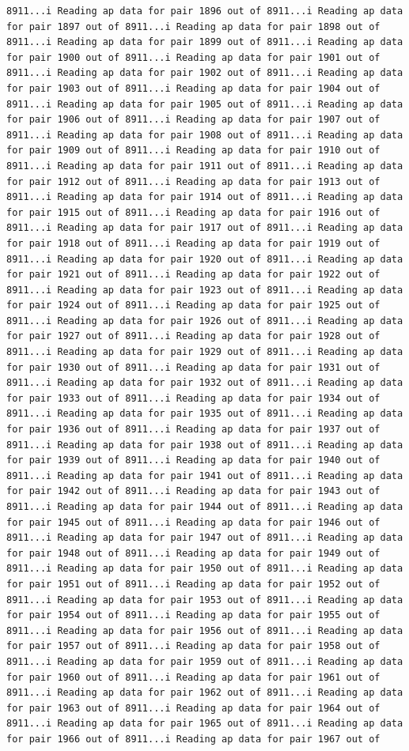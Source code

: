 \documentclass[
]{article}
\begin{document}
\begin{verbatim}
8911...i Reading ap data for pair 1896 out of 8911...i Reading ap data for pair 1897 out of 8911...i Reading ap data for pair 1898 out of 8911...i Reading ap data for pair 1899 out of 8911...i Reading ap data for pair 1900 out of 8911...i Reading ap data for pair 1901 out of 8911...i Reading ap data for pair 1902 out of 8911...i Reading ap data for pair 1903 out of 8911...i Reading ap data for pair 1904 out of 8911...i Reading ap data for pair 1905 out of 8911...i Reading ap data for pair 1906 out of 8911...i Reading ap data for pair 1907 out of 8911...i Reading ap data for pair 1908 out of 8911...i Reading ap data for pair 1909 out of 8911...i Reading ap data for pair 1910 out of 8911...i Reading ap data for pair 1911 out of 8911...i Reading ap data for pair 1912 out of 8911...i Reading ap data for pair 1913 out of 8911...i Reading ap data for pair 1914 out of 8911...i Reading ap data for pair 1915 out of 8911...i Reading ap data for pair 1916 out of 8911...i Reading ap data for pair 1917 out of 8911...i Reading ap data for pair 1918 out of 8911...i Reading ap data for pair 1919 out of 8911...i Reading ap data for pair 1920 out of 8911...i Reading ap data for pair 1921 out of 8911...i Reading ap data for pair 1922 out of 8911...i Reading ap data for pair 1923 out of 8911...i Reading ap data for pair 1924 out of 8911...i Reading ap data for pair 1925 out of 8911...i Reading ap data for pair 1926 out of 8911...i Reading ap data for pair 1927 out of 8911...i Reading ap data for pair 1928 out of 8911...i Reading ap data for pair 1929 out of 8911...i Reading ap data for pair 1930 out of 8911...i Reading ap data for pair 1931 out of 8911...i Reading ap data for pair 1932 out of 8911...i Reading ap data for pair 1933 out of 8911...i Reading ap data for pair 1934 out of 8911...i Reading ap data for pair 1935 out of 8911...i Reading ap data for pair 1936 out of 8911...i Reading ap data for pair 1937 out of 8911...i Reading ap data for pair 1938 out of 8911...i Reading ap data for pair 1939 out of 8911...i Reading ap data for pair 1940 out of 8911...i Reading ap data for pair 1941 out of 8911...i Reading ap data for pair 1942 out of 8911...i Reading ap data for pair 1943 out of 8911...i Reading ap data for pair 1944 out of 8911...i Reading ap data for pair 1945 out of 8911...i Reading ap data for pair 1946 out of 8911...i Reading ap data for pair 1947 out of 8911...i Reading ap data for pair 1948 out of 8911...i Reading ap data for pair 1949 out of 8911...i Reading ap data for pair 1950 out of 8911...i Reading ap data for pair 1951 out of 8911...i Reading ap data for pair 1952 out of 8911...i Reading ap data for pair 1953 out of 8911...i Reading ap data for pair 1954 out of 8911...i Reading ap data for pair 1955 out of 8911...i Reading ap data for pair 1956 out of 8911...i Reading ap data for pair 1957 out of 8911...i Reading ap data for pair 1958 out of 8911...i Reading ap data for pair 1959 out of 8911...i Reading ap data for pair 1960 out of 8911...i Reading ap data for pair 1961 out of 8911...i Reading ap data for pair 1962 out of 8911...i Reading ap data for pair 1963 out of 8911...i Reading ap data for pair 1964 out of 8911...i Reading ap data for pair 1965 out of 8911...i Reading ap data for pair 1966 out of 8911...i Reading ap data for pair 1967 out of 
\end{verbatim}
\end{document}
